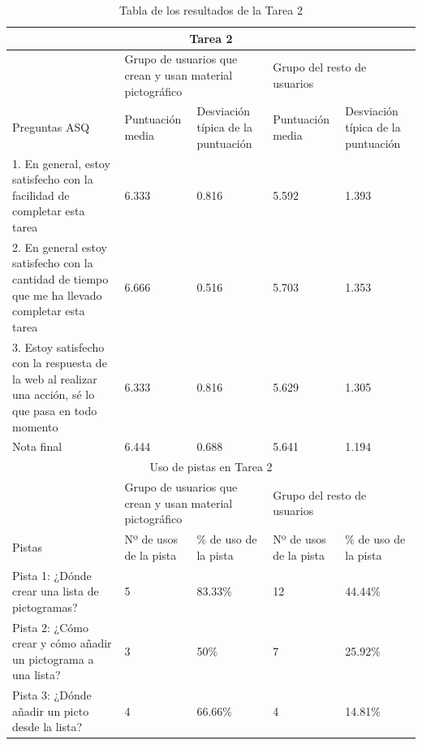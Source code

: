 \begin{table}
\begin{tabular}{ |p{4cm}|p{2cm}|p{2cm}|p{2cm}|p{2cm}|  }
	\hline
	\multicolumn{5}{|c|}{Tarea 2} \\
	\hline
	& \multicolumn{2}{|p{4cm}|}{Grupo de usuarios que crean y usan material pictográfico} & \multicolumn{2}{|p{4cm}|}{Grupo del resto de usuarios }  \\ 
	\hline
	Preguntas ASQ & Puntuación media  &Desviación típica de la puntuación & Puntuación media & Desviación típica de la puntuación\\
	\hline
	1. En general, estoy satisfecho con la facilidad de completar esta tarea &6.333  &0.816 &5.592 &1.393\\
	\hline
	2. En general estoy satisfecho con la cantidad de tiempo que me ha llevado completar esta tarea &6.666  &0.516 &5.703 &1.353\\
	\hline
	3. Estoy satisfecho con la respuesta de la web al realizar una acción, sé lo que pasa en todo momento &6.333 &0.816 &5.629   &1.305\\
	\hline
	Nota final &6.444 &0.688 &5.641  &1.194\\
	\hline
	\multicolumn{5}{|c|}{Uso de pistas en Tarea 2} \\
	\hline
	& \multicolumn{2}{|p{4cm}|}{Grupo de usuarios que crean y usan material pictográfico} & \multicolumn{2}{|p{4cm}|}{Grupo del resto de usuarios }  \\ 
	\hline
	Pistas &Nº de usos de la pista &\% de uso de la pista&Nº de usos de la pista&\% de uso de la pista\\
	\hline
	Pista 1: ¿Dónde crear una lista de pictogramas? &5  &83.33\% &12 &44.44\%\\
	\hline
	Pista 2: ¿Cómo crear y cómo añadir un pictograma a una lista? &3  &50\%  &7 &25.92\%\\
	\hline
	Pista 3: ¿Dónde añadir un picto desde la lista? &4 &66.66\% &4  &14.81\%\\
	\hline
\end{tabular}
\caption{\label{tab:area2respuestas}Tabla de los resultados de la Tarea 2}
\end{table}


